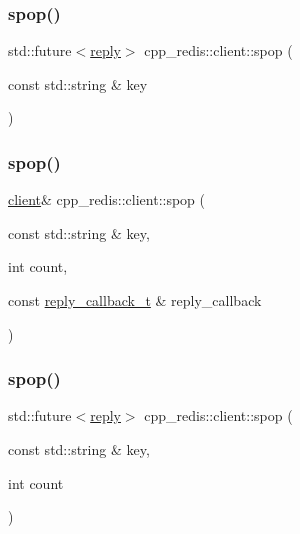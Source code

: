 \mbox{\label{classcpp__redis_1_1client_aabd8e3ddf02299eb129af8ad27555282}} 
\subsubsection{\texorpdfstring{spop()}{spop()}\hspace{0.1cm}{\footnotesize\ttfamily [2/4]}}
{\footnotesize\ttfamily std\+::future$<$\hyperlink{classcpp__redis_1_1reply}{reply}$>$ cpp\+\_\+redis\+::client\+::spop (\begin{DoxyParamCaption}\item[{const std\+::string \&}]{key }\end{DoxyParamCaption})}

\mbox{\label{classcpp__redis_1_1client_a75a34f373c405999036a1e7e476ff201}} 
\subsubsection{\texorpdfstring{spop()}{spop()}\hspace{0.1cm}{\footnotesize\ttfamily [3/4]}}
{\footnotesize\ttfamily \hyperlink{classcpp__redis_1_1client}{client}\& cpp\+\_\+redis\+::client\+::spop (\begin{DoxyParamCaption}\item[{const std\+::string \&}]{key,  }\item[{int}]{count,  }\item[{const \hyperlink{classcpp__redis_1_1client_a061a1140d36d2eaeda82b09a0bb3f9f2}{reply\+\_\+callback\+\_\+t} \&}]{reply\+\_\+callback }\end{DoxyParamCaption})}

\mbox{\label{classcpp__redis_1_1client_acde89afde549cbe7ead5453fd3635081}} 
\subsubsection{\texorpdfstring{spop()}{spop()}\hspace{0.1cm}{\footnotesize\ttfamily [4/4]}}
{\footnotesize\ttfamily std\+::future$<$\hyperlink{classcpp__redis_1_1reply}{reply}$>$ cpp\+\_\+redis\+::client\+::spop (\begin{DoxyParamCaption}\item[{const std\+::string \&}]{key,  }\item[{int}]{count }\end{DoxyParamCaption})}

